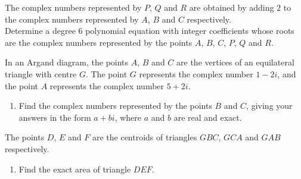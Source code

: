 \documentclass[leqno]{article}
\begin{document}
\begin{enumerate}[
  label=\textbf{\arabic*.},
  leftmargin=*,
  topsep=0pt,
  partopsep=0pt,
  parsep=0pt
]
The complex numbers represented by $P$, $Q$ and $R$ are obtained by adding $2$ to the complex numbers represented by $A$, $B$ and $C$ respectively. \\

Determine a degree $6$ polynomial equation with integer coefficients whose roots are the complex numbers represented by the points $A$, $B$, $C$, $P$, $Q$ and $R$. 


\newpage

\questionitem

In an Argand diagram, the points $A$, $B$ and $C$ are the vertices of an equilateral triangle with centre $G$. The point $G$ represents the complex number $1-2i$, and the point $A$ represents the complex number $5+2i$. \\
\begin{enumerate}[label=\textbf{(\alph*)}]
  \item Find the complex numbers represented by the points $B$ and $C$, giving your answers in the form $a+bi$, where $a$ and $b$ are real and exact.  \\
\end{enumerate}
The points $D$, $E$ and $F$ are the centroids of triangles $GBC$, $GCA$ and $GAB$ respectively. \\
\begin{enumerate}[label=\textbf{(\alph*)}, resume]
  \item Find the exact area of triangle $DEF$.  \\
\end{enumerate}

\newpage

\questionitem

\begin{figure}[H]
    \centering
{}
\end{figure}
\end{enumerate}
\end{document}
